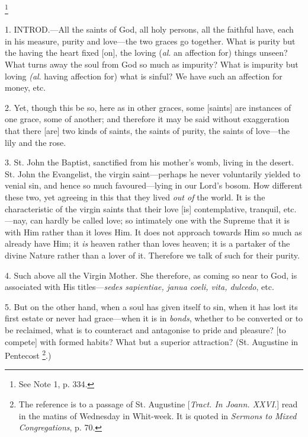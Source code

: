 \footnote{See Note 1, p. 334.}

1. INTROD.—All
the saints of God, all holy persons, all the faithful have, each in
his measure, purity and love—the two graces go together. What is
purity but the having the heart fixed [on], the loving (\emph{al}. an
affection for) things unseen? What turns away the soul from God so
much as impurity? What is impurity but loving \emph{(al}. having affection for) what is sinful? We have such an affection
for money, etc.

2. Yet, though this be so, here as in other
graces, some [saints] are instances of one grace, some of another; and
therefore it may be said without exaggeration that there [are] two
kinds of saints, the saints of purity, the saints of love—the lily
and the rose.

3. St. John the Baptist, sanctified from his
mother's womb, living in the desert. St. John the Evangelist, the
virgin saint—perhaps he never voluntarily yielded to venial sin, and
hence so much favoured—lying in our Lord's bosom. How different these two, yet agreeing in this that they lived \emph{out of} the
world. It is the characteristic of the virgin saints that their love
[is] contemplative, tranquil, etc.—nay, can hardly be called love;
so intimately one with the Supreme that it is with Him rather than it
loves Him. It does not approach towards Him so much as already have
Him; it \emph{is} heaven rather than loves heaven; it is a partaker of
the divine Nature rather than a lover of it. Therefore we talk of such
for their purity.

4. Such above all the Virgin Mother. She
therefore, as coming so near to God, is associated with His titles—\emph{sedes
sapientiae, janua coeli, vita, dulcedo}, etc.

5. But on the other hand, when a soul has given
itself to sin, when it has lost its first estate or never had
grace—when it is in \emph{bonds}, whether to be converted or to be
reclaimed, what is to counteract and antagonise to pride and pleasure?
[to compete] with formed habits? What but a superior attraction? (St.
Augustine in Pentecost \footnote{The reference is to a
passage of St. Augustine [\emph{Tract. In Joann. XXVI}.] read in the
matins of Wednesday in Whit-week. It is quoted in \emph{Sermons to Mixed
Congregations}, p. 70.}.)

